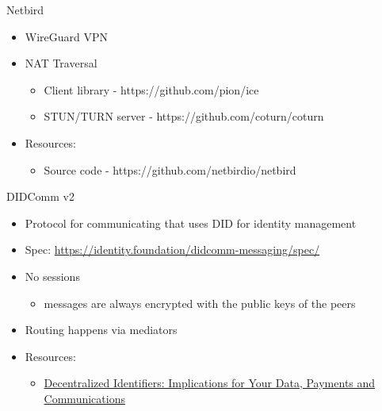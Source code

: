 \hypertarget{notes__02059-netbird.md}{}
\begin{block}{Netbird}
\protect\hypertarget{notes__02059-netbird.md__netbird}{}
\begin{itemize}
\tightlist
\item
  WireGuard VPN
\item
  NAT Traversal

  \begin{itemize}
  \tightlist
  \item
    Client library - https://github.com/pion/ice
  \item
    STUN/TURN server - https://github.com/coturn/coturn
  \end{itemize}
\item
  Resources:

  \begin{itemize}
  \tightlist
  \item
    Source code - https://github.com/netbirdio/netbird
  \end{itemize}
\end{itemize}
\end{block}

\hypertarget{notes__02090-didcomm.md}{}
\begin{block}{DIDComm v2}
\protect\hypertarget{notes__02090-didcomm.md__didcomm-v2}{}
\begin{itemize}
\tightlist
\item
  Protocol for communicating that uses DID for identity management
\item
  Spec: \url{https://identity.foundation/didcomm-messaging/spec/}
\item
  No sessions

  \begin{itemize}
  \tightlist
  \item
    messages are always encrypted with the public keys of the peers
  \end{itemize}
\item
  Routing happens via mediators
\item
  Resources:

  \begin{itemize}
  \tightlist
  \item
    \href{https://newsletter.impervious.ai/decentralized-identifiers-implications-for-your-data-payments-and-communications-2/}{Decentralized
    Identifiers: Implications for Your Data, Payments and
    Communications}
  \end{itemize}
\end{itemize}
\end{block}

